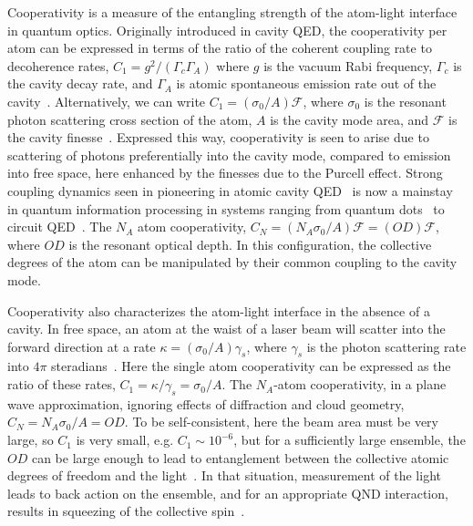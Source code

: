 \documentclass[preprint,aps,pra,onecolumn,superscriptaddress]{revtex4-1} %
\begin{document}
Cooperativity is a measure of the entangling strength of the atom-light interface in quantum optics.  Originally introduced in cavity QED, the cooperativity per atom can be expressed in terms of the ratio of the coherent coupling rate to decoherence rates, $C_1 = g^2/(\Gamma_c \Gamma_A)$ where $g$ is the vacuum Rabi frequency,  $\Gamma_c$ is the cavity decay rate, and $\Gamma_A$ is atomic spontaneous emission rate out of the cavity~\cite{?}.  Alternatively, we can write $C_1 = (\sigma_0/A) \mathcal{F}$, where $\sigma_0$ is the resonant photon scattering cross section of the atom, $A$ is the cavity mode area, and $\mathcal{F}$ is the cavity finesse~\cite{?}.  Expressed this way, cooperativity is seen to arise due to scattering of photons preferentially into the cavity mode, compared to emission into free space, here enhanced by the finesses due to the Purcell effect. Strong coupling dynamics seen in pioneering in atomic cavity QED~\cite{Aoki2006,Miller2005} is now a mainstay in quantum information processing in systems ranging from quantum dots~\cite{Akimov2007,Akopian2006,Liu2010} to circuit QED~\cite{Wallraff2004Strong,Vlastakis2013,Tosi2014}.  The $N_A$ atom cooperativity, $C_N = (N_A \sigma_0/A) \mathcal{F} =( OD) \mathcal{F}$, where $OD$ is the resonant optical depth.  In this configuration, the collective degrees of the atom can be manipulated by their common coupling to the cavity mode.

Cooperativity also characterizes the atom-light interface in the absence of a cavity.  In free space, an atom at the waist of a laser beam will scatter into the forward direction at a rate $\kappa = (\sigma_0/A) \gamma_s$, where $\gamma_s$ is the photon scattering rate into $4 \pi$ steradians~\cite{?}.  Here the single atom cooperativity can be expressed as the ratio of these rates, $C_1 = \kappa/\gamma_s = \sigma_0/A$.  The $N_A$-atom cooperativity, in a plane wave approximation, ignoring effects of diffraction and cloud geometry, $C_N = N_A \sigma_0/A = OD$.  To be self-consistent, here the beam area must be very large, so $C_1$ is very small, e.g. $C_1 \sim 10^{-6}$, but for a sufficiently large ensemble, the $OD$ can be large enough to lead to entanglement between the collective atomic degrees of freedom and the light~\cite{Kuzmich1998,Takahashi1999Quantum}.  In that situation, measurement of the light leads to back action on the ensemble, and for an appropriate QND interaction, results in squeezing of the collective spin~\cite{Madsen2004Spin,Kuzmich2000}.
\end{document}
